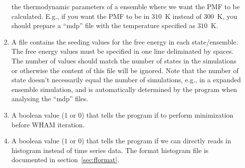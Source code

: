\begin{enumerate}
  the thermodynamic parameters of a ensemble where we want the PMF to be calculated.
  E.g., if you want the PMF to be in $310$~K instead of $300$~K, you should prepare
  a ``mdp'' file with the temperature specified as $310$~K.
  \item A file contains the seeding values for the free energy in each state/ensemble.
  The free energy values must be specified in one line deliminated by spaces. 
  The number of values should match the number of states in the simulations or otherwise
  the content of this file will be ignored. Note that the number of state doesn't 
  necessarily equal the number of simulations, e.g., in a expanded ensemble simulation, 
  and is automatically determined by the program when analysing the ``mdp'' files.
  \item A boolean value ($1$ or $0$) that tells the program if to perform
  minimization before WHAM iteration.
  \item A boolean value ($1$ or $0$) that tells the program if we can directly reads 
  in histogram instead of time series data. The format histogram file is documented in 
  section~\ref{sec:fformat}.
\end{enumerate}

